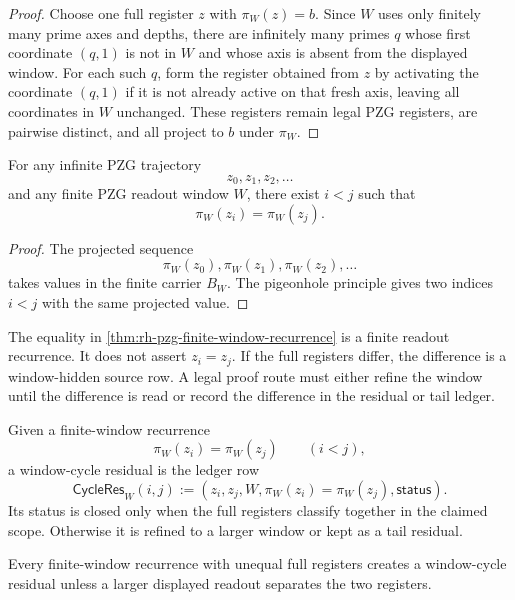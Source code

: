 \begin{proof}
Choose one full register $z$ with $\pi_W(z)=b$.  Since $W$ uses only finitely
many prime axes and depths, there are infinitely many primes $q$ whose first
coordinate $(q,1)$ is not in $W$ and whose axis is absent from the displayed
window.  For each such $q$, form the register obtained from $z$ by activating
the coordinate $(q,1)$ if it is not already active on that fresh axis, leaving
all coordinates in $W$ unchanged.  These registers remain legal PZG registers,
are pairwise distinct, and all project to $b$ under $\pi_W$.
\end{proof}

\begin{theorem}
\label{thm:rh-pzg-finite-window-recurrence}
For any infinite PZG trajectory
$$
z_0,z_1,z_2,\ldots
$$
and any finite PZG readout window $W$, there exist $i<j$ such that
$$
\pi_W(z_i)=\pi_W(z_j).
$$
\end{theorem}

\begin{proof}
The projected sequence
$$
\pi_W(z_0),\pi_W(z_1),\pi_W(z_2),\ldots
$$
takes values in the finite carrier $B_W$.  The pigeonhole principle gives two
indices $i<j$ with the same projected value.
\end{proof}

\begin{principle}
\label{prin:rh-pzg-finite-return-not-global-repetition}
The equality in \autoref{thm:rh-pzg-finite-window-recurrence} is a finite
readout recurrence.  It does not assert $z_i=z_j$.  If the full registers
differ, the difference is a window-hidden source row.  A legal proof route
must either refine the window until the difference is read or record the
difference in the residual or tail ledger.
\end{principle}

\begin{definition}
\label{def:rh-pzg-window-cycle-residual}
Given a finite-window recurrence
$$
\pi_W(z_i)=\pi_W(z_j)
\qquad(i<j),
$$
a window-cycle residual is the ledger row
$$
\mathsf{CycleRes}_W(i,j)
:=
(z_i,z_j,W,\pi_W(z_i)=\pi_W(z_j),\mathsf{status}).
$$
Its status is closed only when the full registers classify together in the
claimed scope.  Otherwise it is refined to a larger window or kept as a tail
residual.
\end{definition}

\begin{theorem}
\label{thm:rh-pzg-window-recurrence-ledger-obligation}
Every finite-window recurrence with unequal full registers creates a
window-cycle residual unless a larger displayed readout separates the two
registers.
\end{theorem}

